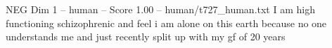 \begin{textsample}{NEG Dim 1 – human – Score 1.00 – human/t727\_human.txt}  \label{ex:f1_neg_012}
I am high functioning schizophrenic and feel i am alone on this earth because no one understands me and just recently split up with my gf of 20 years

\end{textsample}
